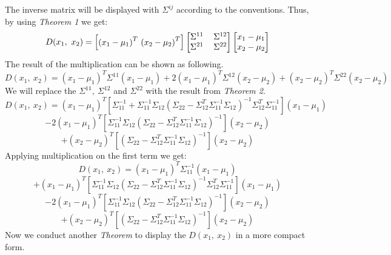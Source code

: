 \documentclass[12pt]{article}
\numberwithin{equation}{section}
\numberwithin{table}{section}
\numberwithin{figure}{section}
\begin{document}
The inverse matrix will be displayed with $\Sigma^{ij}$ according to the conventions. Thus, by using \textit{Theorem 1} we get:
$$
	D(x_1,\ x_2) = \renewcommand\arraystretch{1}
	\setlength\arraycolsep{6pt}
	\begin{bmatrix}
	{(x_1 - \mu_1)}^{T}\ 
	{(x_2 - \mu_2)}^{T}\\
	\end{bmatrix}
	\renewcommand\arraystretch{1}
	\setlength\arraycolsep{6pt}
	\begin{bmatrix}
	\Sigma^{11} & \Sigma^{12} \\
	\Sigma^{21} & \Sigma^{22}\\
	\end{bmatrix}\renewcommand\arraystretch{1}
	\setlength\arraycolsep{6pt}
	\begin{bmatrix}
	x_1 - \mu_1\\
	x_2 - \mu_2\\
	\end{bmatrix}	
$$
The result of the multiplication can be shown as following.
$$
	D(x_1,\ x_2) = (x_1 - \mu_1)^{T}\Sigma^{11}(x_1 - \mu_1) + 2(x_1 - \mu_1)^T\Sigma^{12}(x_2- \mu_2) + (x_2-\mu_2)^T\Sigma^{22}(x_2-\mu_2)
$$
We will replace the $\Sigma^{11},\ \Sigma^{12}$ and $\Sigma^{22}$ with the result from \textit{Theorem 2}. 
$$
	D(x_1,\ x_2) = (x_1 - \mu_1)^{T}[\Sigma_{11}^{-1} + \Sigma_{11}^{-1}\Sigma_{12}(\Sigma_{22} - \Sigma_{12}^{T}\Sigma_{11}^{-1}\Sigma_{12})^{-1}\Sigma_{12}^{T}\Sigma_{11}^{-1}](x_1 - \mu_1)
$$
$$
	-2(x_1 - \mu_1)^{T}[\Sigma_{11}^{-1}\Sigma_{12}(\Sigma_{22} - \Sigma_{12}^{T} \Sigma_{11}^{-1}\Sigma_{12})^{-1}](x_2-\mu_2)
$$
$$
	+(x_2 - \mu_2)^{T}[(\Sigma_{22} - \Sigma_{12}^T\Sigma_{11}^{-1}\Sigma_{12})^{-1}](x_2- \mu_2)
$$
Applying multiplication on the first term we get:
$$
D(x_1,\ x_2) = (x_1 - \mu_1)^{T}\Sigma_{11}^{-1}(x_1 - \mu_1)
$$
$$
	+ (x_1 - \mu_1)^{T}[ \Sigma_{11}^{-1}\Sigma_{12}(\Sigma_{22} - \Sigma_{12}^{T}\Sigma_{11}^{-1}\Sigma_{12})^{-1}\Sigma_{12}^{T}\Sigma_{11}^{-1}](x_1 - \mu_1)
$$
$$
-2(x_1 - \mu_1)^{T}[\Sigma_{11}^{-1}\Sigma_{12}(\Sigma_{22} - \Sigma_{12}^{T} \Sigma_{11}^{-1}\Sigma_{12})^{-1}](x_2-\mu_2)
$$
$$
+(x_2 - \mu_2)^{T}[(\Sigma_{22} - \Sigma_{12}^T\Sigma_{11}^{-1}\Sigma_{12})^{-1}](x_2- \mu_2)
$$
Now we conduct another \textit{Theorem} to display the $D(x_1,\ x_2)$ in a more compact form.
\end{document}
